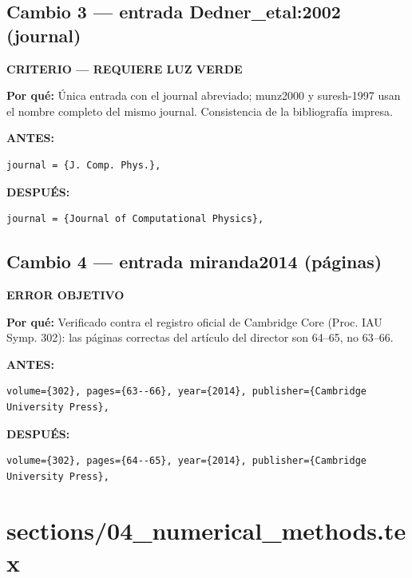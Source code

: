 \documentclass[11pt,a4paper]{article}
\begin{document}
\subsection*{Cambio 3 --- entrada Dedner\_etal:2002 (journal)}
\colorbox{critbg}{\textbf{\footnotesize CRITERIO --- REQUIERE LUZ VERDE}}

\textbf{Por qué:} Única entrada con el journal abreviado; munz2000 y suresh-1997 usan el nombre completo del mismo journal. Consistencia de la bibliografía impresa.

\textcolor{antesline}{\textbf{ANTES:}}
\begin{Verbatim}[breaklines=true, breakanywhere=true, fontsize=\small, frame=leftline, rulecolor=\color{antesline}, framerule=1.2pt]
  journal = {J. Comp. Phys.},
\end{Verbatim}
\textcolor{despline}{\textbf{DESPUÉS:}}
\begin{Verbatim}[breaklines=true, breakanywhere=true, fontsize=\small, frame=leftline, rulecolor=\color{despline}, framerule=1.2pt]
  journal = {Journal of Computational Physics},
\end{Verbatim}

\subsection*{Cambio 4 --- entrada miranda2014 (páginas)}
\colorbox{okbg}{\textbf{\footnotesize ERROR OBJETIVO}}

\textbf{Por qué:} Verificado contra el registro oficial de Cambridge Core (Proc. IAU Symp. 302): las páginas correctas del artículo del director son 64--65, no 63--66.

\textcolor{antesline}{\textbf{ANTES:}}
\begin{Verbatim}[breaklines=true, breakanywhere=true, fontsize=\small, frame=leftline, rulecolor=\color{antesline}, framerule=1.2pt]
  volume={302}, pages={63--66}, year={2014}, publisher={Cambridge University Press},
\end{Verbatim}
\textcolor{despline}{\textbf{DESPUÉS:}}
\begin{Verbatim}[breaklines=true, breakanywhere=true, fontsize=\small, frame=leftline, rulecolor=\color{despline}, framerule=1.2pt]
  volume={302}, pages={64--65}, year={2014}, publisher={Cambridge University Press},
\end{Verbatim}


\section*{sections/04\_numerical\_methods.tex}
\end{document}
